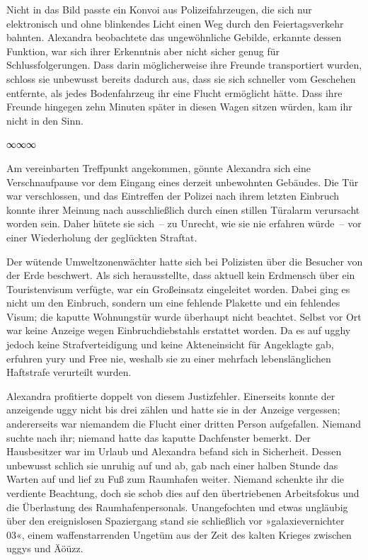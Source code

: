 Nicht in das Bild passte ein Konvoi aus Polizeifahrzeugen, die sich nur elektronisch und ohne blinkendes Licht einen Weg durch den Feiertagsverkehr bahnten. Alexandra beobachtete das ungewöhnliche Gebilde, erkannte dessen Funktion, war sich ihrer Erkenntnis aber nicht sicher genug für Schlussfolgerungen. Dass darin möglicherweise ihre Freunde transportiert wurden, schloss sie unbewusst bereits dadurch aus, dass sie sich schneller vom Geschehen entfernte, als jedes Bodenfahrzeug ihr eine Flucht ermöglicht hätte. Dass ihre Freunde hingegen zehn Minuten später in diesen Wagen sitzen würden, kam ihr nicht in den Sinn.

\begin{center}
∞∞∞
\end{center}

Am vereinbarten Treffpunkt angekommen, gönnte Alexandra sich eine Verschnaufpause vor dem Eingang eines derzeit unbewohnten Gebäudes. Die Tür war verschlossen, und das Eintreffen der Polizei nach ihrem letzten Einbruch konnte ihrer Meinung nach ausschließlich durch einen stillen Türalarm verursacht worden sein. Daher hütete sie sich~– zu Unrecht, wie sie nie erfahren würde~– vor einer Wiederholung der geglückten Straftat.

Der wütende Umweltzonenwächter hatte sich bei Polizisten über die Besucher von der Erde beschwert. Als sich herausstellte, dass aktuell kein Erdmensch über ein Touristenvisum verfügte, war ein Großeinsatz eingeleitet worden. Dabei ging es nicht um den Einbruch, sondern um eine fehlende Plakette und ein fehlendes Visum; die kaputte Wohnungstür wurde überhaupt nicht beachtet. Selbst vor Ort war keine Anzeige wegen Einbruchdiebstahls erstattet worden. Da es auf ugghy jedoch keine Strafverteidigung und keine Akteneinsicht für Angeklagte gab, erfuhren yury und Free nie, weshalb sie zu einer mehrfach lebenslänglichen Haftstrafe verurteilt wurden.

Alexandra profitierte doppelt von diesem Justizfehler. Einerseits konnte der anzeigende uggy nicht bis drei zählen und hatte sie in der Anzeige vergessen; andererseits war niemandem die Flucht einer dritten Person aufgefallen. Niemand suchte nach ihr; niemand hatte das kaputte Dachfenster bemerkt. Der Hausbesitzer war im Urlaub und Alexandra befand sich in Sicherheit. Dessen unbewusst schlich sie unruhig auf und ab, gab nach einer halben Stunde das Warten auf und lief zu Fuß zum Raumhafen weiter. Niemand schenkte ihr die verdiente Beachtung, doch sie schob dies auf den übertriebenen Arbeitsfokus und die Überlastung des Raumhafenpersonals. Unangefochten und etwas ungläubig über den ereignislosen Spaziergang stand sie schließlich vor »galaxievernichter 03«, einem waffenstarrenden Ungetüm aus der Zeit des kalten Krieges zwischen uggys und Äöüzz.

